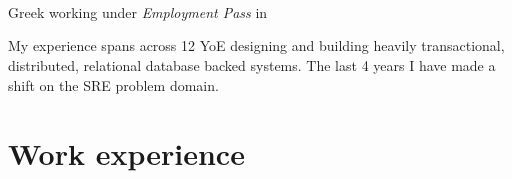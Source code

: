 \documentclass{CVSoftwareEngineer}
\begin{document}
	\section{\textbf{\cvname}}
	\begin{center}
		\href{mailto:\cvmail}{\cvmail} \space \textbar \space \cvlinkedin \space \textbar \space \cvgithub \\
		Greek working under \textit{Employment Pass} in \cvaddress
	\end{center}
	My experience spans across 12 YoE designing and building heavily transactional, distributed,
	relational database backed systems. The last 4 years I have made a shift on the SRE problem domain.

	\section{Work experience}
\end{document}

